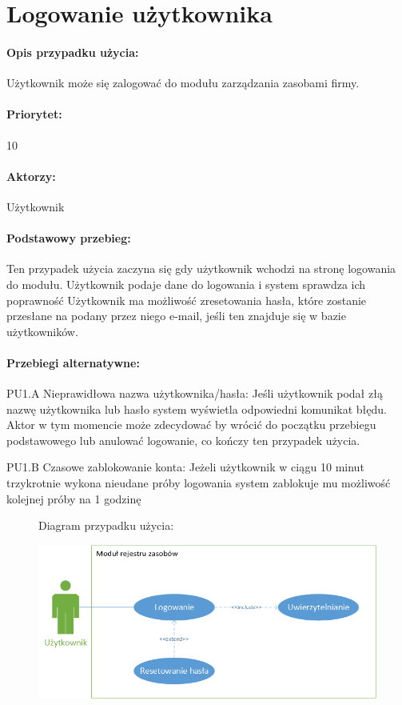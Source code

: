 \documentclass[11pt, a4paper, oneside]{report}
\begin{document}
\section{Logowanie użytkownika}
\paragraph{Opis przypadku użycia:}
Użytkownik może się zalogować do modułu zarządzania zasobami firmy.
\paragraph{Priorytet:} 10
\paragraph{Aktorzy:} Użytkownik
\paragraph{Podstawowy przebieg:}
Ten przypadek użycia zaczyna się gdy użytkownik wchodzi na stronę logowania do modułu.
Użytkownik podaje dane do logowania i system sprawdza ich poprawność
Użytkownik ma możliwość zresetowania hasła, które zostanie przesłane na podany przez niego e-mail, jeśli ten znajduje się w bazie użytkowników.
\paragraph{Przebiegi alternatywne:} 
PU1.A Nieprawidłowa nazwa użytkownika/hasła:
Jeśli użytkownik podał złą nazwę użytkownika lub hasło system wyświetla odpowiedni komunikat błędu. Aktor w tym momencie może zdecydować by wrócić do początku przebiegu podstawowego lub anulować logowanie, co kończy ten przypadek użycia.

PU1.B Czasowe zablokowanie konta:
Jeżeli użytkownik w ciągu 10 minut trzykrotnie wykona nieudane próby logowania system zablokuje mu możliwość kolejnej próby na 1 godzinę


\begin{figure}[H]
Diagram przypadku użycia:

\centering
\includegraphics[scale=1]{uzytkownik_logowanie.png}
\end{figure}
\end{document}
